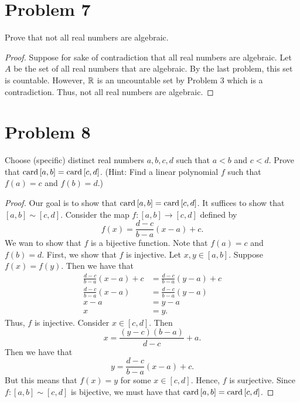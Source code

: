 \documentclass[11pt,a4paper]{article}
\begin{document}
\section*{Problem 7} Prove that not all real numbers are algebraic.
\begin{proof}
    Suppose for sake of contradiction that all real numbers are algebraic. Let \( A  \) be the set of all real numbers that are algebraic. By the last problem, this set is countable. However, \( \mathbb{R}  \) is an uncountable set by Problem 3 which is a contradiction. Thus, not all real numbers are algebraic.  
\end{proof}

\section*{Problem 8} Choose (specific) distinct real numbers \( a,b,c,d  \) such that \( a < b  \) and \( c < d  \). Prove that \( \operatorname{card}{[a,b]} = \operatorname{card}{[c,d]}  \). (Hint: Find a linear polynomial \( f  \) such that \( f(a) = c  \) and \( f(b) = d  \).)
\begin{proof}
    Our goal is to show that \( \operatorname{card}{[a,b]} = \operatorname{card}{[c,d]} \). It suffices to show that \( [a,b] \sim [c,d] \). Consider the map \( f: [a,b] \to [c,d] \) defined by
\[  f(x) = \frac{ d - c  }{  b - a  } (x-a) + c.    \]
We wan to show that \( f  \) is a bijective function.
Note that \( f(a) = c  \) and \( f(b) = d   \). First, we show that \( f  \) is injective. Let \( x,y \in [a,b]  \). Suppose \( f(x) = f(y) \). Then we have that  
\begin{align*}
    \frac{ d - c  }{  b - a  } ( x- a) + c &= \frac{ d - c  }{ b - a  }  (y - a) + c  \\
    \frac{ d - c  }{  b - a  }  (x -a) &= \frac{ d - c  }{  b - a  }  (y-a) \\
    x - a &= y - a \\
    x &= y.
\end{align*}
Thus, \( f  \) is injective. Consider \( x \in [c,d] \). Then 
\[  x = \frac{ (y-c) (b-a) }{ d - c  } + a. \]
Then we have that 
\[  y = \frac{ d - c  }{  b - a  }  (x - a ) + c. \]
But this means that \( f(x) = y \) for some \( x \in [c,d] \). Hence, \( f  \) is surjective. Since \( f: [a,b] \sim [c,d] \) is bijective, we must have that \( \operatorname{card}{[a,b]} = \operatorname{card}{[c,d]} \).
\end{proof}
\end{document}
